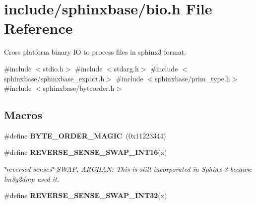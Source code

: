 \section{include/sphinxbase/bio.h File Reference}
\label{bio_8h}


Cross platform binary IO to process files in sphinx3 format.  


{\ttfamily \#include $<$stdio.\+h$>$}\newline
{\ttfamily \#include $<$stdarg.\+h$>$}\newline
{\ttfamily \#include $<$sphinxbase/sphinxbase\+\_\+export.\+h$>$}\newline
{\ttfamily \#include $<$sphinxbase/prim\+\_\+type.\+h$>$}\newline
{\ttfamily \#include $<$sphinxbase/byteorder.\+h$>$}\newline
\subsection*{Macros}
\begin{DoxyCompactItemize}
\item 
\mbox{\label{bio_8h_ac08e1e4728563a03ff6c937bfa8fd845}} 
\#define {\bfseries B\+Y\+T\+E\+\_\+\+O\+R\+D\+E\+R\+\_\+\+M\+A\+G\+IC}~(0x11223344)
\item 
\#define \textbf{ R\+E\+V\+E\+R\+S\+E\+\_\+\+S\+E\+N\+S\+E\+\_\+\+S\+W\+A\+P\+\_\+\+I\+N\+T16}(x)
\begin{DoxyCompactList}\small\item\em \char`\"{}reversed senses\char`\"{} S\+W\+AP, A\+R\+C\+H\+AN\+: This is still incorporated in Sphinx 3 because lm3g2dmp used it. \end{DoxyCompactList}\item 
\mbox{\label{bio_8h_a2c277e579a007b5c46bd762a7d18b2cf}} 
\#define {\bfseries R\+E\+V\+E\+R\+S\+E\+\_\+\+S\+E\+N\+S\+E\+\_\+\+S\+W\+A\+P\+\_\+\+I\+N\+T32}(x)
\end{DoxyCompactItemize}
